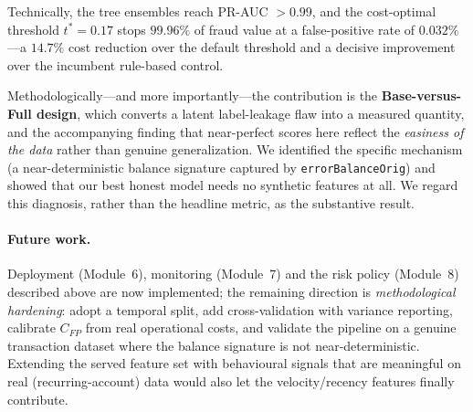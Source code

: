 \documentclass{article}
\begin{document}
Technically, the tree ensembles reach PR-AUC $>0.99$, and the
cost-optimal threshold $t^{*} = 0.17$ stops $99.96\%$ of fraud value at
a false-positive rate of $0.032\%$---a $14.7\%$ cost reduction over the
default threshold and a decisive improvement over the incumbent
rule-based control.

Methodologically---and more importantly---the contribution is the
\textbf{Base-versus-Full design}, which converts a latent label-leakage
flaw into a measured quantity, and the accompanying finding that
near-perfect scores here reflect the \emph{easiness of the data} rather
than genuine generalization. We identified the specific mechanism (a
near-deterministic balance signature captured by
\texttt{errorBalanceOrig}) and showed that our best honest model needs
no synthetic features at all. We regard this diagnosis, rather than the
headline metric, as the substantive result.

\paragraph{Future work.} Deployment (Module~6), monitoring (Module~7)
and the risk policy (Module~8) described above are now implemented; the
remaining direction is \emph{methodological hardening}: adopt a temporal
split, add cross-validation with variance reporting, calibrate $C_{FP}$
from real operational costs, and validate the pipeline on a genuine
transaction dataset where the balance signature is not
near-deterministic. Extending the served feature set with behavioural
signals that are meaningful on real (recurring-account) data would also
let the velocity/recency features finally contribute.
\end{document}

